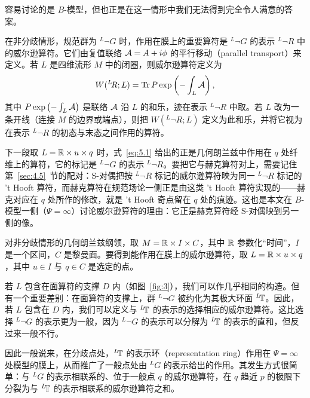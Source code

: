\label{sec:5.2}

容易讨论的是 $B$-模型，但也正是在这一情形中我们无法得到完全令人满意的答案。

在非分歧情形，规范群为 $^L\neg G$ 时，作用在膜上的重要算符是 $^L\neg G$ 的表示 $^L\neg R$ 中的威尔逊算符。它们由复值联络 ${\mathcal A}=A+i\phi$ 的平行移动（parallel transport）来定义。若 $L$ 是四维流形 $M$ 中的闭圈，则威尔逊算符定义为
\setcounter{equation}{0}
\begin{equation}\label{eq:5.1}
  W({}^L\negthinspace
R;L)={\rm Tr}\,P\exp\left(-\int_L{\mathcal A}\right),
\end{equation}
 其中 $P\exp\left(-\int_L{\mathcal A}\right)$ 是联络 ${\mathcal A}$ 沿 $L$ 的和乐，迹在表示 $^L\neg R$ 中取。若 $L$ 改为一条开线（连接 $M$ 的边界或端点），则把 $W({}^L\neg R;L)$ 定义为此和乐，并将它视为在表示 $^L\neg R$ 的初态与末态之间作用的算符。

\begin{yizhu}[物理图像补充]
下一段取 $L={\mathbb{R}}\times u\times q$ 时，式~\eqref{eq:5.1} 给出的正是几何朗兰兹中作用在 $q$ 处纤维上的算符，它的标记是 $^L\neg G$ 的表示 $^L\neg R$。要把它与赫克算符对上，需要记住第~\ref{sec:4.5}~节的配对：S-对偶把按 $^L\neg R$ 标记的威尔逊算符映为同一 $^L\neg R$ 标记的 't Hooft 算符，而赫克算符在规范场论一侧正是由这类 't Hooft 算符实现的——赫克对应在 $q$ 处所作的修改，就是 't Hooft 奇点留在 $q$ 处的痕迹。这也是本文在 $B$-模型一侧（$\Psi=\infty$）讨论威尔逊算符的理由：它正是赫克算符经 S-对偶映到另一侧的像。
\end{yizhu}

对非分歧情形的几何朗兰兹纲领，取 $M={\mathbb{R}}\times I\times C$，其中 ${\mathbb{R}}$ 参数化“时间”，$I$ 是一个区间，$C$ 是黎曼面。要得到能作用在膜上的威尔逊算符，取 $L={\mathbb{R}}\times u\times q$，其中 $u\in I$ 与 $q\in C$ 是选定的点。

若 $L$ 包含在面算符的支撑 $D$ 内（如图~\ref{fig:3}），我们可以作几乎相同的构造。但有一个重要差别：在面算符的支撑上，群 $^L\neg G$ 被约化为其极大环面 $^L\negthinspace {\mathbb{T}}$。因此，若 $L$ 包含在 $D$ 内，我们可以定义与 $^L\negthinspace {\mathbb{T}}$ 的表示的选择相应的威尔逊算符。这比选择 $^L\neg G$ 的表示更为一般，因为 $^L\neg G$ 的表示可以分解为 $^L\negthinspace {\mathbb{T}}$ 的表示的直和，但反过来一般不行。

因此一般说来，在分歧点处，$^L\negthinspace {\mathbb{T}}$ 的表示环（representation ring）作用在 $\Psi=\infty$ 处模型的膜上，从而推广了一般点处由 $^LG$ 的表示给出的作用。其发生方式很简单：与 $^LG$ 的表示相联系的、位于一般点 $q$ 的威尔逊算符，在 $q$ 趋近 $p$ 的极限下分裂为与 $^L\negthinspace {\mathbb{T}}$ 的表示相联系的威尔逊算符之和。

